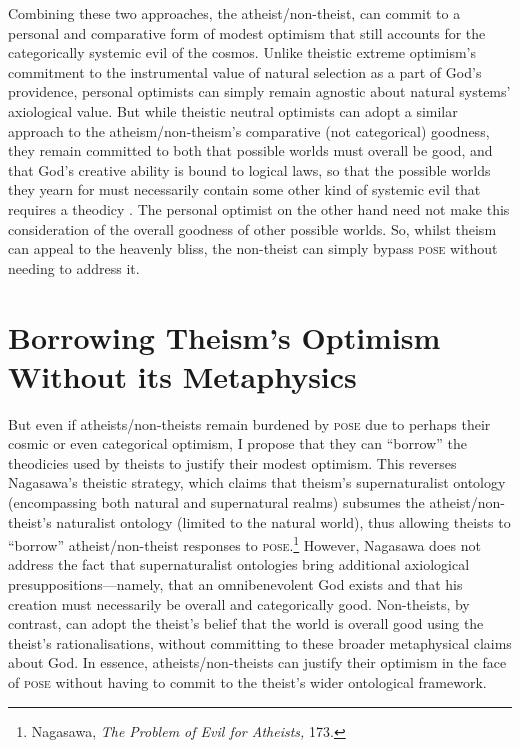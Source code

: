 Combining these two approaches, the atheist/non-theist, can commit to a
personal and comparative form of modest optimism that still accounts for
the categorically systemic evil of the cosmos. Unlike theistic extreme
optimism's commitment to the instrumental value of natural selection as
a part of God's providence, personal optimists can simply remain
agnostic about natural systems' axiological value. But while theistic
neutral optimists can adopt a similar approach to the
atheism/non-theism's comparative (not categorical) goodness, they remain
committed to both that possible worlds must overall be good, and that
God's creative ability is bound to logical laws, so that the possible
worlds they yearn for must necessarily contain some other kind of
systemic evil that requires a theodicy . The personal optimist on the
other hand need not make this consideration of the overall goodness of
other possible worlds. So, whilst theism can appeal to the heavenly
bliss, the non-theist can simply bypass \textsc{pose} without needing to address
it.

\section{Borrowing Theism's Optimism Without its Metaphysics}

But even if atheists/non-theists remain burdened by \textsc{pose} due to perhaps
their cosmic or even categorical optimism, I propose that they can
``borrow'' the theodicies used by theists to justify their modest
optimism. This reverses Nagasawa's theistic strategy, which claims that
theism's supernaturalist ontology (encompassing both natural and
supernatural realms) subsumes the atheist/non-theist's naturalist
ontology (limited to the natural world), thus allowing theists to
``borrow'' atheist/non-theist responses to \textsc{pose}.\footnote{Nagasawa,
  \emph{The Problem of Evil for Atheists,} 173.} However, Nagasawa does
not address the fact that supernaturalist ontologies bring additional
axiological presuppositions---namely, that an omnibenevolent God exists
and that his creation must necessarily be overall and categorically
good. Non-theists, by contrast, can adopt the theist's belief that the
world is overall good using the theist's rationalisations, without
committing to these broader metaphysical claims about God. In essence,
atheists/non-theists can justify their optimism in the face of \textsc{pose}
without having to commit to the theist's wider ontological framework.

